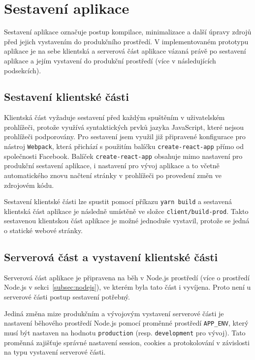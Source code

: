 
\section{Sestavení aplikace}

Sestavení aplikace označuje postup kompilace, minimalizace a další úpravy zdrojů před jejich vystavením do produkčního prostředí.
V implementovaném prototypu aplikace je na sebe klientská a serverová část aplikace vázaná právě po sestavení aplikace a jejím vystavení do produkční prostředí (více v následujících podsekcích).

\subsection{Sestavení klientské části}

Klientská část vyžaduje sestavení před každým spuštěním v uživatelském prohlížeči, protože využívá syntaktických prvků jazyka JavaScript, které nejsou prohlížeči podporovány.
Pro sestavení jsem využil již připravené konfigurace pro nástroj \texttt{Webpack}, která přichází s použitím balíčku \texttt{create-react-app} přímo od společnosti Facebook.
Balíček \texttt{create-react-app} obsahuje mimo nastavení pro produkční sestavení aplikace, i nastavení pro vývoj aplikace a to včetně automatického znovu načtení stránky v prohlížeči po provedení změn ve zdrojovém kódu.

Sestavení klientské části lze spustit pomocí příkazu \texttt{yarn build} a sestavená klientská část aplikace je následně umístěně ve složce \texttt{client/build-prod}.
Takto sestavenou klientskou část aplikace je možné jednoduše vystavil, protože se jedná o statické webové stránky.

\subsection{Serverová část a vystavení klientské části}

Serverová část aplikace je připravena na běh v Node.js prostředí (více o prostředí Node.js v sekci~\ref{subsec:nodejs}), ve kterém byla tato část i vyvíjena.
Proto není u serverové části postup sestavení potřebný.

Jediná změna mize produkčním a vývojovým vystavení serverové části je nastavení běhového prostředí Node.js pomocí proměnné prostředí \texttt{APP\_ENV}, který musí být nastaven na hodnotu \texttt{production} (resp. \texttt{development} pro vývoj).
Tato proměnná zajišťuje správné nastavení session, cookies a protokolování v závislosti na typu vystavení serverové části.

